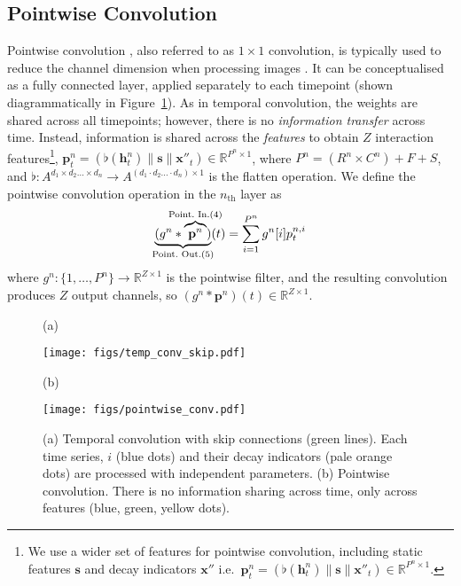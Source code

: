 \documentclass[sigconf]{acmart}
\begin{document}
\subsection{Pointwise Convolution}
Pointwise convolution \citep{lin2013network}, also referred to as $1\times1$ convolution, is typically used to reduce the channel dimension when processing images \citep{DBLP:journals/corr/SzegedyLJSRAEVR14}. It can be conceptualised as a fully connected layer, applied separately to each timepoint (shown diagrammatically in Figure~\ref{fig:temp_pointwise}). As in temporal convolution, the weights are shared across all timepoints; however, there is no \textit{information transfer} across time. Instead, information is shared across the \textit{features} to obtain $Z$ interaction features\footnote{We use a wider set of features for pointwise convolution, including static features $\mathbf{s}$ and decay indicators $\mathbf{x''}$ i.e.\ $\mathbf{p}_t^{n} = (\flat(\mathbf{h}_t^{n}) \parallel \mathbf{s} \parallel \mathbf{x''}_t)\in\mathbb{R}^{P^{n}\times 1}$.}, $\mathbf{p}_t^{n} = (\flat(\mathbf{h}_t^{n}) \parallel \mathbf{s} \parallel \mathbf{x''}_t)\in\mathbb{R}^{P^{n}\times 1}$, where $P^{n} = (R^{n} \times C^{n}) + F + S$, and $\flat:A^{d_1 \times d_2 \ldots \times d_n}\to A^{(d_1 \cdot d_2 \ldots \cdot d_n)\times 1}$ is the flatten operation. We define the pointwise convolution operation in the $n_\text{th}$ layer as
\begin{equation}
    \underbrace{(g^{n} \ast \overbrace{\mathbf{p}^{n}}^{\mathclap{\text{Point.\ In.}(4)}})}_{\mathclap{\text{Point.\ Out.}(5)}}(t) = \sum_{i=1}^{P^{n}}g^{n}[i]p_t^{n,i}
\end{equation}
where $g^{n}:\{1,\ldots,P^{n}\}\to\mathbb{R}^{Z\times 1}$ is the pointwise filter, and the resulting convolution produces $Z$ output channels, so $(g^{n} \ast \mathbf{p}^{n})(t)\in\mathbb{R}^{Z\times 1}$.

\begin{figure}
  \centering
  \begin{minipage}{0.05\textwidth}
    \centering
    (a)
  \end{minipage}
  \begin{minipage}{0.39\textwidth}
      \texttt{[image: figs/temp\_conv\_skip.pdf]}
      \vspace{0.1em}
  \end{minipage}
  \begin{minipage}{0.05\textwidth}
      \centering
    (b)
  \end{minipage}
  \begin{minipage}{0.39\textwidth}
  \texttt{[image: figs/pointwise\_conv.pdf]}
  \end{minipage}
  \caption{(a) Temporal convolution with skip connections (green lines). Each time series, $i$ (blue dots) and their decay indicators (pale orange dots) are processed with independent parameters. (b) Pointwise convolution. There is no information sharing across time, only across features (blue, green, yellow dots).}
\label{fig:temp_pointwise}
\end{figure}
\end{document}
